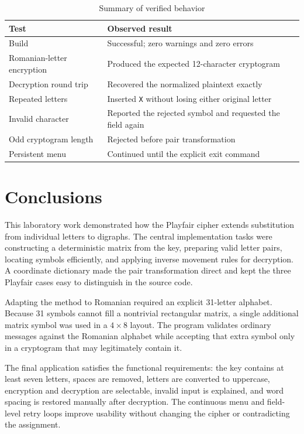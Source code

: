 \documentclass[12pt,a4paper]{article}
\begin{document}
\begin{table}[H]
  \centering
  \caption{Summary of verified behavior}
  \renewcommand{\arraystretch}{1.25}
  \begin{tabular}{>{\raggedright\arraybackslash}p{}>{\raggedright\arraybackslash}p{}}
    \toprule
    \textbf{Test} & \textbf{Observed result} \\
    \midrule
    Build & Successful; zero warnings and zero errors \\
    Romanian-letter encryption & Produced the expected 12-character cryptogram \\
    Decryption round trip & Recovered the normalized plaintext exactly \\
    Repeated letters & Inserted \texttt{X} without losing either original letter \\
    Invalid character & Reported the rejected symbol and requested the field again \\
    Odd cryptogram length & Rejected before pair transformation \\
    Persistent menu & Continued until the explicit exit command \\
    \bottomrule
  \end{tabular}
\end{table}

\newpage
\section{Conclusions}

This laboratory work demonstrated how the Playfair cipher extends substitution from individual letters to digraphs. The central implementation tasks were constructing a deterministic matrix from the key, preparing valid letter pairs, locating symbols efficiently, and applying inverse movement rules for decryption. A coordinate dictionary made the pair transformation direct and kept the three Playfair cases easy to distinguish in the source code.

Adapting the method to Romanian required an explicit 31-letter alphabet. Because 31 symbols cannot fill a nontrivial rectangular matrix, a single additional matrix symbol was used in a $4\times8$ layout. The program validates ordinary messages against the Romanian alphabet while accepting that extra symbol only in a cryptogram that may legitimately contain it.

The final application satisfies the functional requirements: the key contains at least seven letters, spaces are removed, letters are converted to uppercase, encryption and decryption are selectable, invalid input is explained, and word spacing is restored manually after decryption. The continuous menu and field-level retry loops improve usability without changing the cipher or contradicting the assignment.
\end{document}
